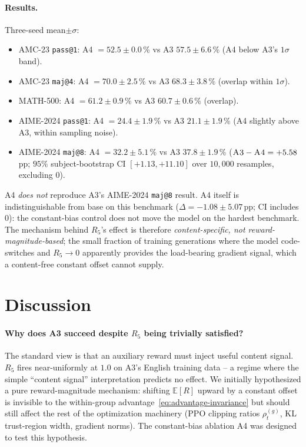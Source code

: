 \documentclass[11pt]{article}
\newcommand{\armC}{\textsc{A3}}
\newcommand{\armD}{\textsc{A4}}
\newcommand{\R}[1]{R_{#1}}
\newcommand{\E}{\mathbb{E}}
\begin{document}
\paragraph{Results.} Three-seed mean$\pm\sigma$:
\begin{itemize}\itemsep0pt
\item AMC-23 \texttt{pass@1}: \armD{} $=52.5\pm 0.0$\,\% vs \armC{}
$57.5\pm 6.6$\,\% (\armD{} below \armC{}'s $1\sigma$ band).
\item AMC-23 \texttt{maj@4}: \armD{} $=70.0\pm 2.5$\,\% vs \armC{}
$68.3\pm 3.8$\,\% (overlap within $1\sigma$).
\item MATH-500: \armD{} $=61.2\pm 0.9$\,\% vs \armC{} $60.7\pm 0.6$\,\%
(overlap).
\item AIME-2024 \texttt{pass@1}: \armD{} $=24.4\pm 1.9$\,\% vs \armC{}
$21.1\pm 1.9$\,\% (\armD{} slightly above \armC{}, within sampling
noise).
\item AIME-2024 \texttt{maj@8}: \armD{} $=32.2\pm 5.1$\,\% vs \armC{}
$37.8\pm 1.9$\,\% ($\armC{}-\armD{}=+5.58$\,pp; $95\%$ subject-bootstrap
CI $[+1.13, +11.10]$ over $10{,}000$ resamples, excluding $0$).
\end{itemize}

\armD{} \emph{does not} reproduce \armC{}'s AIME-2024 \texttt{maj@8}
result. \armD{} itself is indistinguishable from base on this benchmark
($\Delta = -1.08 \pm 5.07$\,pp; CI includes $0$): the constant-bias
control does not move the model on the hardest benchmark. The
mechanism behind $\R{5}$'s effect is therefore \emph{content-specific,
not reward-magnitude-based}; the small fraction of training generations
where the model code-switches and $\R{5} \to 0$ apparently provides
the load-bearing gradient signal, which a content-free constant offset
cannot supply.

\section{Discussion}
\label{sec:discussion}

\paragraph{Why does \armC{} succeed despite $\R{5}$ being trivially
satisfied?}
The standard view is that an auxiliary reward must inject useful
content signal. $\R{5}$ fires near-uniformly at $1.0$ on \armC{}'s
English training data -- a regime where the simple ``content signal''
interpretation predicts no effect. We initially hypothesized a pure
reward-magnitude mechanism: shifting $\E[R]$ upward by a constant
offset is invisible to the within-group advantage~\eqref{eq:advantage-invariance}
but should still affect the rest of the optimization machinery
(PPO clipping ratios $\rho_t^{(g)}$, KL trust-region width, gradient
norms). The constant-bias ablation \armD{} was designed to test this
hypothesis.
\end{document}

